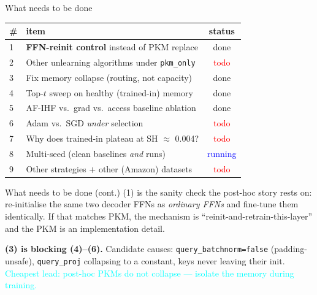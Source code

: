 \documentclass{beamer}
\newcommand{\pierre}[1]{\textcolor{cyan}{#1}}
\newcommand{\stdone}{\textcolor{green!50!black}{done}}
\newcommand{\strun}{\textcolor{blue}{running}}
\newcommand{\sttodo}{\textcolor{red}{todo}}
\begin{document}
\begin{frame}{What needs to be done}
\begin{center}
\begin{tabular}{|l|l|c|}
\hline
\# & item & status \\
\hline
1 & \textbf{FFN-reinit control} instead of PKM replace   & \stdone \\
2 & Other unlearning algorithms under \texttt{pkm\_only} & \sttodo \\
3 & Fix memory collapse (routing, not capacity)          & \stdone \\
4 & Top-$t$ sweep on healthy (trained-in) memory         & \stdone \\
5 & AF-IHF vs.\ grad vs.\ access baseline ablation       & \stdone \\
6 & Adam vs.\ SGD \emph{under} selection                 & \sttodo \\
7 & Why does trained-in plateau at SH $\approx$ 0.004?   & \sttodo \\
8 & Multi-seed (clean baselines \emph{and} runs)         & \strun \\
9 & Other strategies $+$ other (Amazon) datasets         & \sttodo \\
\hline
\end{tabular}
\end{center}

\end{frame}

\begin{frame}{What needs to be done (cont.)}
\alert{(1) is the sanity check the post-hoc story rests on:} re-initialise the
same two decoder FFNs as \emph{ordinary FFNs} and fine-tune them identically.
If that matches PKM, the mechanism is ``reinit-and-retrain-this-layer'' and the
PKM is an implementation detail.

\medskip
\textbf{(3) is blocking (4)--(6).} Candidate causes:
\texttt{query\_batchnorm=false} (padding-unsafe), \texttt{query\_proj} collapsing
to a constant, keys never leaving their init.
\pierre{Cheapest lead: post-hoc PKMs do not collapse --- isolate the memory
during training.}
\end{frame}
\end{document}
